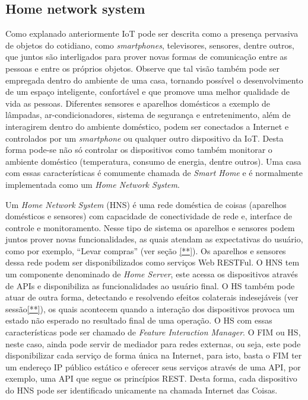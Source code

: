 \subsection{Home network system}
\label{sec:hns}
Como explanado anteriormente IoT pode ser descrita como a presença pervasiva de objetos do cotidiano, como \textit{smartphones}, televisores, sensores, dentre outros, que juntos são interligados para prover novas formas de comunicação entre as pessoas e entre os próprios objetos. Observe que tal visão também pode ser empregada dentro do ambiente de uma casa, tornando possível o desenvolvimento de um espaço inteligente, confortável e que promove uma melhor qualidade de vida as pessoas. Diferentes sensores e aparelhos domésticos a exemplo de lâmpadas, ar-condicionadores, sistema de segurança e entretenimento, além de interagirem dentro do ambiente doméstico, podem ser conectados a Internet e controlados por um \textit{smartphone} ou qualquer outro dispositivo da IoT. Desta forma pode-se não só controlar os dispositivos como também monitorar o ambiente doméstico (temperatura, consumo de energia, dentre outros). Uma casa com essas características é comumente chamada de \textit{Smart Home} e é normalmente implementada como um \textit{Home Network System}.\cite{Piyare:2013}

Um \textit{Home Network System} (HNS) é uma rede doméstica de coisas (aparelhos domésticos e sensores) com capacidade de conectividade de rede e, interface de controle e monitoramento. Nesse tipo de sistema os aparelhos e sensores podem juntos prover novas funcionalidades, as quais atendam as expectativas do usuário, como por exemplo, ``Levar compras'' (ver seção \ref{**}). Os aparelhos e sensores dessa rede podem ser disponibilizados como serviços Web RESTFul. O HNS tem um componente denominado de \textit{Home Server}, este acessa os dispositivos através de APIs e disponibiliza as funcionalidades ao usuário final. O HS também pode atuar de outra forma, detectando e resolvendo efeitos colaterais indesejáveis (ver sessão\ref{**}), os quais acontecem quando a interação dos dispositivos provoca um estado não esperado no resultado final de uma operação. O HS com essas características pode ser chamado de \textit{Feature Interaction Manager}. O FIM ou HS, neste caso, ainda pode servir de mediador para redes externas, ou seja, este pode disponibilizar cada serviço de forma única na Internet, para isto, basta o FIM ter um endereço IP público estático e oferecer seus serviços através de uma API, por exemplo, uma API que segue os princípios REST. Desta forma, cada dispositivo do HNS pode ser identificado unicamente na chamada Internet das Coisas. \cite{Nakamura:2009}\cite{Ikegami:2013}

